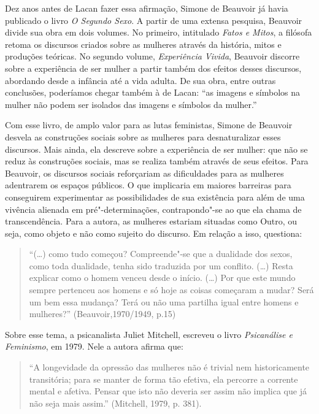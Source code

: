 Dez anos antes de Lacan fazer essa afirmação, Simone de Beauvoir já
havia publicado o livro \emph{O Segundo Sexo}. A partir de uma extensa
pesquisa, Beauvoir divide sua obra em dois volumes. No primeiro,
intitulado \emph{Fatos e Mitos}, a filósofa retoma os discursos criados
sobre as mulheres através da história, mitos e produções teóricas. No
segundo volume, \emph{Experiência Vivida}, Beauvoir discorre sobre a
experiência de ser mulher a partir também dos efeitos desses discursos,
abordando desde a infância até a vida adulta. De sua obra, entre outras
conclusões, poderíamos chegar também à de Lacan: ``as imagens e símbolos
na mulher não podem ser isolados das imagens e símbolos da mulher.''

Com esse livro, de amplo valor para as lutas feministas, Simone de
Beauvoir desvela as construções sociais sobre as mulheres para
desnaturalizar esses discursos. Mais ainda, ela descreve sobre a
experiência de ser mulher: que não se reduz às construções sociais, mas
se realiza também através de seus efeitos. Para Beauvoir, os discursos
sociais reforçariam as dificuldades para as mulheres adentrarem os
espaços públicos. O que implicaria em maiores barreiras para conseguirem
experimentar as possibilidades de sua existência para além de uma
vivência alienada em pré"-determinações, contrapondo"-se ao que ela chama
de transcendência. Para a autora, as mulheres estariam situadas como
Outro, ou seja, como objeto e não como sujeito do discurso. Em relação a
isso, questiona:

\begin{quote}
``(\ldots{}) como tudo começou? Compreende"-se que a dualidade dos sexos, como
toda dualidade, tenha sido traduzida por um conflito. (\ldots{}) Resta
explicar como o homem venceu desde o início. (\ldots{}) Por que este mundo
sempre pertenceu aos homens e só hoje as coisas começaram a mudar? Será
um bem essa mudança? Terá ou não uma partilha igual entre homens e
mulheres?'' (Beauvoir,1970/1949, p.15)
\end{quote}

Sobre esse tema, a psicanalista Juliet Mitchell, escreveu o livro
\emph{Psicanálise e Feminismo}, em 1979. Nele a autora afirma que:

\begin{quote}
``A longevidade da opressão das mulheres não é trivial nem
historicamente transitória; para se manter de forma tão efetiva, ela
percorre a corrente mental e afetiva. Pensar que isto não deveria ser
assim não implica que já não seja mais assim.'' (Mitchell, 1979, p.
381).
\end{quote}

